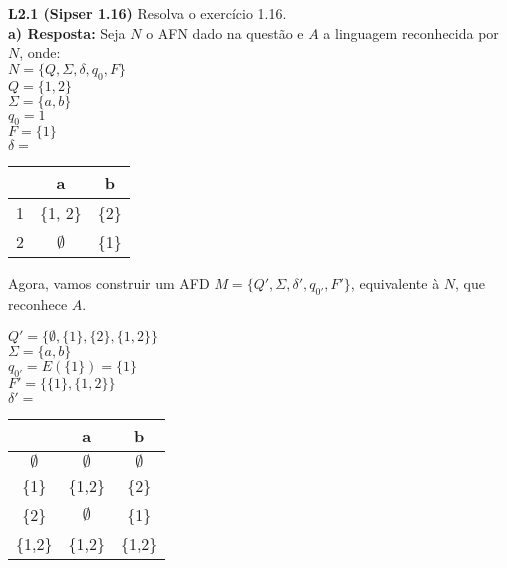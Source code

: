 
\noindent \textbf{L2.1 (Sipser 1.16)} Resolva o exercício 1.16.\\[3pt]
\noindent\textbf{a) Resposta:} Seja $N$ o AFN dado na questão e $A$ a linguagem reconhecida por $N$, onde:\\[6pt]
\noindent$N = \{Q, \Sigma, \delta, q_{0}, F\}$\\
$Q = \{1,2\}$\\
$\Sigma = \{a, b\}$\\
$q_0 = 1$\\
$F = \{1\}$\\
$\delta = $
\begin{table}[!h]
\centering
{}
\begin{tabular}{c|c|c}
        & a          & b        \\ \hline
1       & \{1, 2\}   & \{2\}    \\
2       & $\emptyset$       & \{1\}    \\
\end{tabular}
\end{table}

Agora, vamos construir um AFD $M = \{Q', \Sigma, \delta', q_{0'}, F'\}$, equivalente à $N$, que reconhece $A$.

\noindent$Q' = \{\emptyset, \{1\}, \{2\}, \{1,2\} \}$\\
$\Sigma = \{a, b\}$\\
$q_{0'} = E(\{1\}) = \{1\}$\\
$F' = \{\{1\}, \{1,2\}\}$\\
$\delta' = $
\begin{table}[!h]
\centering
{}
\begin{tabular}{c|c|c}
         & a        & b                                 \\ \hline
$\emptyset$         & $\emptyset$       & $\emptyset$   \\
\{1\}               & \{1,2\}           & \{2\}         \\
\{2\}               & $\emptyset$       & \{1\}         \\
\{1,2\}             & \{1,2\}           & \{1,2\}
\end{tabular}
\end{table}


